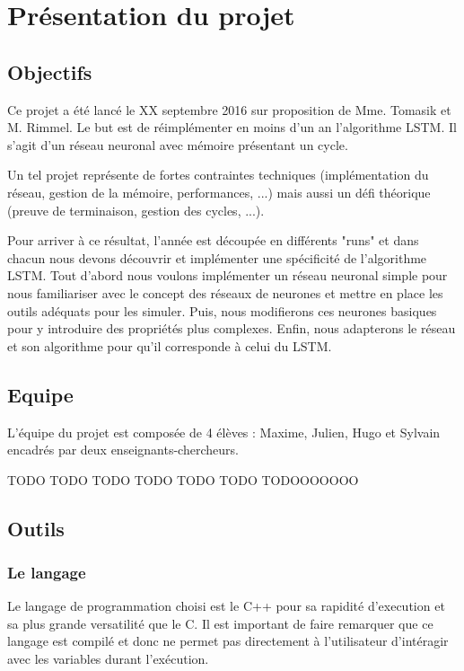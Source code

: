 
\chapter{Présentation du projet}

\section{Objectifs}

Ce projet a été lancé le XX septembre 2016 sur proposition de Mme. Tomasik et
M. Rimmel. Le but est de réimplémenter en moins d'un an l'algorithme
LSTM\footnotemark. Il s'agit d'un réseau neuronal avec mémoire présentant
un cycle.

\bigskip

Un tel projet représente de fortes contraintes techniques (implémentation du
réseau, gestion de la mémoire, performances, ...) mais aussi un défi théorique
(preuve de terminaison, gestion des cycles, ...).

\bigskip

Pour arriver à ce résultat, l'année est découpée en différents "runs" et dans
chacun nous devons découvrir et implémenter une spécificité de l'algorithme
LSTM. Tout d'abord nous voulons implémenter un réseau neuronal simple pour
nous familiariser avec le concept des réseaux de neurones et mettre en place
les outils adéquats pour les simuler. Puis, nous modifierons ces neurones
basiques pour y introduire des propriétés plus complexes. Enfin, nous
adapterons le réseau et son algorithme pour qu'il corresponde à celui du LSTM.

\section{Equipe}

L'équipe du projet est composée de 4 élèves : Maxime, Julien, Hugo et Sylvain
encadrés par deux enseignants-chercheurs.

TODO TODO TODO TODO TODO TODO TODOOOOOOO

\section{Outils}

\subsection{Le langage}
Le langage de programmation choisi est le C++ pour sa rapidité d'execution et
sa plus grande versatilité que le C. Il est important de faire remarquer que
ce langage est compilé et donc ne permet pas directement à l'utilisateur
d'intéragir avec les variables durant l'exécution.

